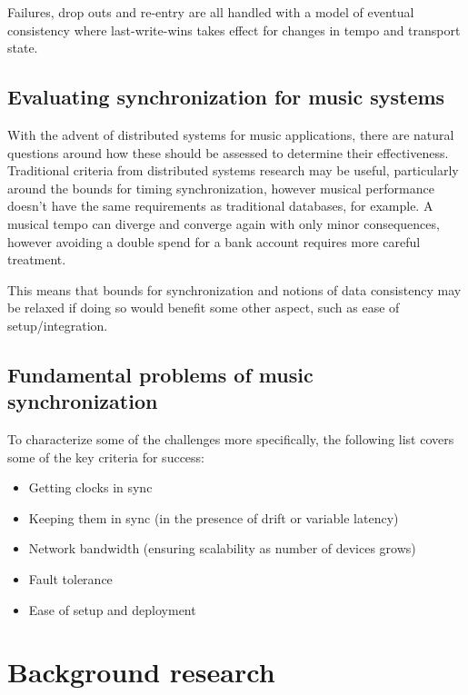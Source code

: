 \documentclass[11pt]{article} %
\theoremstyle{plain}
\theoremstyle{definition}
\begin{document}
Failures, drop outs and re-entry are all handled with a model of eventual
consistency where last-write-wins takes effect for changes in tempo and
transport state.

\subsection{Evaluating synchronization for music systems}

With the advent of distributed systems for music applications, there are
natural questions around how these should be assessed to determine their
effectiveness. Traditional criteria from distributed systems research may be
useful, particularly around the bounds for timing synchronization, however
musical performance doesn't have the same requirements as traditional
databases, for example. A musical tempo can diverge and converge again with
only minor consequences, however avoiding a double spend for a bank account
requires more careful treatment.

This means that bounds for synchronization and notions of data consistency may
be relaxed if doing so would benefit some other aspect, such as ease of
setup/integration.

\subsection{Fundamental problems of music synchronization}

To characterize some of the challenges more specifically, the following list
covers some of the key criteria for success:

\begin{itemize}
  \item Getting clocks in sync \cite[Chapter~6.3.2]{attiya2004distributed}
  \item Keeping them in sync (in the presence of drift or variable latency) \cite[Chapter~13]{attiya2004distributed}
  \item Network bandwidth (ensuring scalability as number of devices grows)
  \item Fault tolerance %
  \item Ease of setup and deployment
\end{itemize}

\section{Background research}
\end{document}
